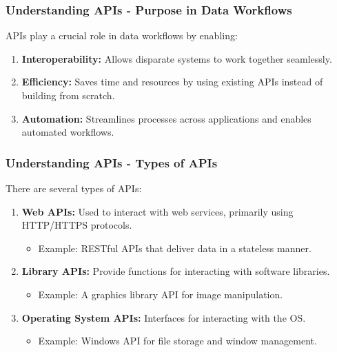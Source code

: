 \documentclass[aspectratio=169]{beamer}
\begin{document}
\begin{frame}[fragile]
    \frametitle{Understanding APIs - Purpose in Data Workflows}
    APIs play a crucial role in data workflows by enabling:
    \begin{enumerate}
        \item \textbf{Interoperability:} Allows disparate systems to work together seamlessly. 
        \item \textbf{Efficiency:} Saves time and resources by using existing APIs instead of building from scratch.
        \item \textbf{Automation:} Streamlines processes across applications and enables automated workflows.
    \end{enumerate}
\end{frame}

\begin{frame}[fragile]
    \frametitle{Understanding APIs - Types of APIs}
    There are several types of APIs:
    \begin{enumerate}
        \item \textbf{Web APIs:} Used to interact with web services, primarily using HTTP/HTTPS protocols. 
        \begin{itemize}
            \item Example: RESTful APIs that deliver data in a stateless manner.
        \end{itemize}
        
        \item \textbf{Library APIs:} Provide functions for interacting with software libraries. 
        \begin{itemize}
            \item Example: A graphics library API for image manipulation.
        \end{itemize}
        
        \item \textbf{Operating System APIs:} Interfaces for interacting with the OS. 
        \begin{itemize}
            \item Example: Windows API for file storage and window management.
        \end{itemize}
    \end{enumerate}
\end{frame}
\end{document}
